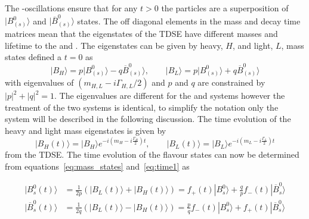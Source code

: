 {The \bsd-\barbsd oscillations ensure that for any $t>0$ the particles are a superposition of $| B^0_{(s)} \rangle$ and $| \overline{B}^0_{(s)} \rangle$ states. The off diagonal elements in the mass and decay time matrices mean that the eigenstates of the TDSE have different masses and lifetime to the \bsd and \barbsd. The eigenstates can be given by heavy, $H$, and light, $L$, mass states defined a $t=0$ as
\begin{equation}
| B_H \rangle = p | B^0_{(s)} \rangle - q \overline{B}^0_{(s)} \rangle, \qquad |B_L \rangle = p  | B^0_{(s)} \rangle + q \overline{B}^0_{(s)} \rangle
\label{eq:mass_states}
\end{equation}
with eigenvalues of $(m_{H,L} - i\Gamma_{H,L}/2)$ and $p$ and $q$ are constrained by $|p|^2 + |q|^2 = 1$. The eigenvalues are different for the \bd and \bs systems however the treatment of the two systems is identical, to simplify the notation only the \bs system will be described in the following discussion.
The time evolution of the heavy and light mass eigenstates is given by
\begin{equation}
  | B_H (t)\rangle = | B_H \rangle e^{-i(m_H - i\frac{\Gamma_H}{2})t}, \qquad | B_L (t)\rangle = | B_L \rangle e^{-i(m_L - i\frac{\Gamma_L}{2})t}
\label{eq:time1}
\end{equation}
from the TDSE. The time evolution of the flavour states can now be determined from equations~\ref{eq:mass_states} and~\ref{eq:time1} as

\begin{align}
| B^{0}_{s}(t) \rangle &= \frac{1}{2p}\left(|B_{L}(t)\rangle + |B_{H}(t) \rangle \right)  = f_{+}(t) |B^{0}_{s} \rangle + \frac{q}{p}f_{-}(t) |\overline{B}^{0}_{s}\rangle \\
| \overline{B}^{0}_{s}(t) \rangle &= \frac{1}{2q}\left(|B_{L}(t)\rangle - |B_{H}(t) \rangle \right)  = \frac{p}{q}f_{-}(t) |B^{0}_{s} \rangle+ f_{+}(t) |\overline{B}^{0}_{s}\rangle 
\end{align}

}
